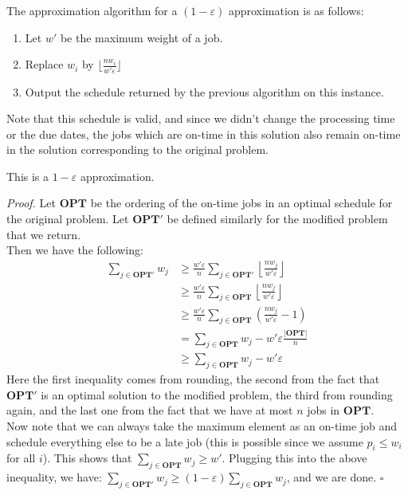 \documentclass[a4paper]{article}
\newenvironment{proof}{\begin{breakbox}\textit{Proof.}}{\hfill$\square$\end{breakbox}}
\newcommand{\nl}{\vspace{0.2cm}\\}
\newcommand{\eps}{\varepsilon}
\newcommand{\OPT}{\mathbf{OPT}}
\begin{document}
The approximation algorithm for a $(1 - \eps)$ approximation is as follows:
\begin{enumerate}
    \item Let $w'$ be the maximum weight of a job.
    \item Replace $w_i$ by $\lfloor\frac{nw_i}{w'\eps}\rfloor$
    \item Output the schedule returned by the previous algorithm on this instance.
\end{enumerate}
Note that this schedule is valid, and since we didn't change the processing time or the due dates, the jobs which are on-time in this solution also remain on-time in the solution corresponding to
the original problem.\nl

\begin{claim}
    This is a $1 - \eps$ approximation.
\end{claim}
\begin{proof}
    Let $\OPT$ be the ordering of the on-time jobs in an optimal schedule for the original problem. Let $\OPT'$ be defined similarly for the modified problem that we return.\nl
    Then we have the following:
    \begin{align*}
        \sum_{j \in \OPT'} w_j &\ge \frac{w' \eps}{n} \sum_{j \in \OPT'} \left\lfloor\frac{nw_j}{w'\eps}\right\rfloor\\
                        &\ge \frac{w' \eps}{n} \sum_{j \in \OPT} \left\lfloor\frac{nw_j}{w'\eps}\right\rfloor\\
                        &\ge \frac{w' \eps}{n} \sum_{j \in \OPT} \left(\frac{nw_j}{w'\eps} - 1\right)\\
                        &= \sum_{j \in \OPT} w_j - w' \eps \frac{|\OPT|}{n}\\
                        &\ge \sum_{j \in \OPT} w_j - w' \eps
    \end{align*}
    Here the first inequality comes from rounding, the second from the fact that $\OPT'$ is an optimal solution to the modified problem, the third from rounding again, and the last one from
    the fact that we have at most $n$ jobs in $\OPT$.\\
    Now note that we can always take the maximum element as an on-time job and schedule everything else to be a late job (this is possible since we assume $p_i \le w_i$ for all $i$). This
    shows that $\sum_{j \in \OPT} w_j \ge w'$. Plugging this into the above inequality, we have:
    $\sum_{j \in \OPT'} w_j \ge (1 - \eps) \sum_{j \in \OPT} w_j$, and we are done.
\end{proof}
\end{document}
